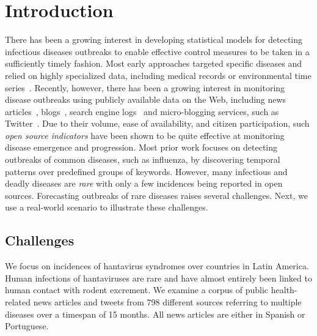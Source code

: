 \documentclass[conference]{IEEEtran}
\begin{document}
\section{Introduction}
\label{sec:intro}
There has been a growing interest in developing statistical models for detecting infectious diseases outbreaks to enable effective control measures to be taken in a sufficiently timely fashion. Most early approaches targeted specific diseases and relied on highly specialized data, including medical records or environmental time series~\cite{wong:02,wong:03}.  Recently, however, there has been a growing interest in monitoring disease outbreaks using publicly available data on the Web, including news articles~\cite{brownstein:2008,linge:09}, blogs~\cite{corley:10}, search engine logs~\cite{ginsberg:09} and micro-blogging services, such as Twitter~\cite{culotta:2010, paul:11, parker:13}. Due to their volume, ease of availability, and citizen participation, such {\em open source indicators} have been shown to be quite effective at monitoring disease emergence and progression. Most prior work focuses on detecting outbreaks of common diseases, such as influenza, by discovering temporal patterns over predefined groups of keywords. However, many infectious and deadly diseases are {\em rare} with only a few incidences being reported in open sources. Forecasting outbreaks of rare diseases raises several challenges. Next, we use a real-world scenario to illustrate these challenges.




\subsection{Challenges}
\label{sec:challenges}
We focus on incidences of hantavirus syndromes over countries in Latin America. Human infections of hantaviruses are rare and have almost entirely been linked to human contact with rodent excrement. We examine a corpus of public health-related news articles and tweets from 798 different sources referring to multiple diseases over a timespan of 15 months. All news articles are either in Spanish or Portuguese.
\end{document}
